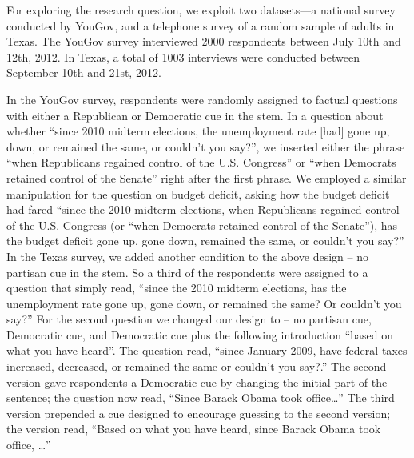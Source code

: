 \documentclass[12pt, letterpaper]{article}
\begin{document}
For exploring the research question, we exploit two datasets---a national survey conducted by YouGov, and a telephone survey of a random sample of adults in Texas. The YouGov survey interviewed 2000 respondents between July 10th and 12th, 2012.  In Texas, a total of 1003 interviews were conducted between September 10th and 21st, 2012. 

In the YouGov survey, respondents were randomly assigned to factual questions with either a Republican or Democratic cue in the stem. In a question about whether ``since 2010 midterm elections, the unemployment rate [had] gone up, down, or remained the same, or couldn't you say?'', we inserted either the phrase “when Republicans regained control of the U.S. Congress'' or ``when Democrats retained control of the Senate” right after the first phrase. We employed a similar manipulation for the question on budget deficit, asking how the budget deficit had fared “since the 2010 midterm elections, when Republicans regained control of the U.S. Congress (or ``when Democrats retained control of the Senate''), has the budget deficit gone up, gone down, remained the same, or couldn't you say?''
In the Texas survey, we added another condition to the above design – no partisan cue in the stem. So a third of the respondents were assigned to a question that simply read, ``since the 2010 midterm elections, has the unemployment rate gone up, gone down, or remained the same?  Or couldn’t you say?'' For the second question we changed our design to – no partisan cue, Democratic cue, and Democratic cue plus the following introduction “based on what you have heard”. The question read, ``since January 2009, have federal taxes increased, decreased, or remained the same or couldn’t you say?.'' The second version gave respondents a Democratic cue by changing the initial part of the sentence; the question now read, “Since Barack Obama took office\ldots''  The third version prepended a cue designed to encourage guessing to the second version; the version read, “Based on what you have heard, since Barack Obama took office, \ldots''

\clearpage
\end{document}
